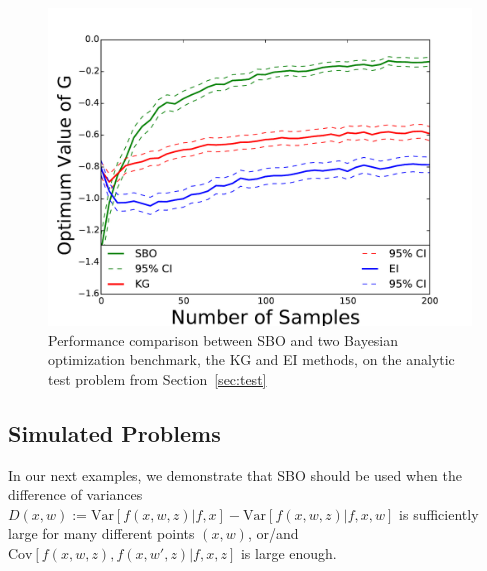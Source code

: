 \documentclass{article}
\newcommand{\w}{w}
\newcommand{\z}{z}
\begin{document}
\begin{figure}[!htb]
	\includegraphics[width=0.9\linewidth]{comparisonSameanal.pdf}
    \caption{Performance comparison between SBO and two Bayesian optimization benchmark, the KG and EI methods, on the analytic test problem from Section~\ref{sec:test} \label{fig:tahi7}}
\end{figure} 

\subsection{Simulated Problems}
\label{sec:GPexample}

In our next examples, we demonstrate that SBO should be used when the difference of variances $D(x,\w):=\mbox{Var}\left[f\left(x,\w,\z\right)|f,x\right]-\mbox{Var}\left[f\left(x,\w,\z\right)|f,x,\w\right]$ is sufficiently large for many different points $(x,\w)$, or/and $\mbox{Cov}\left[f\left(x,\w,\z\right),f\left(x,\w',\z\right)|f,x,z\right]$ is large enough.
\end{document}
